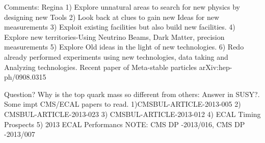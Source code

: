 Comments: Regina
1) Explore unnatural areas to search for new physics by designing new Tools
2) Look back at clues to gain new Ideas for new measurements
3) Exploit existing facilities but also build new facilities.
4) Explore new territories-Using Neutrino Beams, Dark Matter, precision measurements
5) Explore Old ideas in the light of new technologies.
6) Redo already performed experiments using new technologies, data taking and Analyzing technologies.
Recent paper of Meta-stable particles
arXiv:hep-ph/0908.0315

Question? Why is the top quark mass so different from others: 
Answer in SUSY?.
Some impt CMS/ECAL papers to read.
1)CMSBUL-ARTICLE-2013-005
2) CMSBUL-ARTICLE-2013-023 %
3) CMSBUL-ARTICLE-2013-012%
4) ECAL Timing Prospects %
5) 2013 ECAL Performancs NOTE: CMS DP -2013/016, CMS DP -2013/007 


